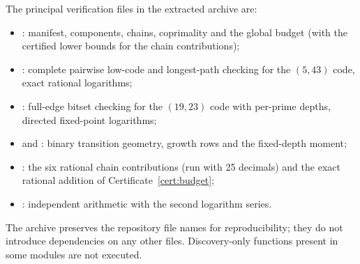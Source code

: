 \documentclass[11pt]{article}
\theoremstyle{definition}
\theoremstyle{remark}
\begin{document}
The principal verification files in the extracted archive are:
\begin{itemize}\small\raggedright
\item {}: manifest,
components, chains, coprimality and the global budget (with the certified lower
bounds for the chain contributions);
\item {}: complete pairwise
low-code and longest-path checking for the $(5,43)$ code, exact rational
logarithms;
\item {}: full-edge bitset
checking for the $(19,23)$ code with per-prime depths, directed fixed-point
logarithms;
\item {} and
: binary transition geometry,
growth rows and the fixed-depth moment;
\item {}: the six
rational chain contributions (run with 25 decimals) and the exact rational
addition of Certificate~\ref{cert:budget};
\item {}: independent
arithmetic with the second logarithm series.
\end{itemize}
The archive preserves the repository file names for reproducibility; they do
not introduce dependencies on any other files. Discovery-only functions present
in some modules are not executed.
\end{document}

